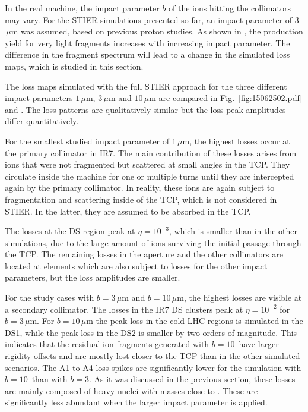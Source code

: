 In the real machine, the impact parameter $b$ of the ions hitting the collimators may vary. For the STIER simulations presented so far, an impact parameter of 3$\,\mu$m was assumed, based on previous proton studies.
As shown in , the production yield for very light fragments increases with increasing impact parameter. The difference in the fragment spectrum will lead to a change in the simulated loss maps, which is studied in this section.

\newpage
The loss maps simulated with the full STIER approach for the three different impact parameters $1\,\mu$m, $3\,\mu$m and $10\,\mu$m are compared in Fig.~\ref{fig:15062502.pdf} and . The loss patterns are qualitatively similar but the loss peak amplitudes differ quantitatively. 

For the smallest studied impact parameter of 1$\,\mu$m, the highest losses occur at the primary collimator in IR7. The main contribution of these losses arises from \lead ions that were not fragmented but scattered at small angles in the TCP. They circulate inside the machine for one or multiple turns until they are intercepted again by the primary collimator. In reality, these ions are again subject to fragmentation and scattering inside of the TCP, which is not considered in STIER. In the latter, they are assumed to be absorbed in the TCP.

The losses at the DS region peak at $\eta=10^{-3}$, which is smaller than in the other simulations, due to the large amount of \lead ions surviving the initial passage through the TCP. The remaining losses in the aperture and the other collimators are located at elements which are also subject to losses for the other impact parameters, but the loss amplitudes are smaller. 

For the study cases with $b=3\,\mu$m and $b=10\,\mu$m, the highest losses are visible at a secondary collimator. The losses in the IR7 DS clusters peak at $\eta=10^{-2}$ for $b=3\,\mu$m. For $b=10\,\mu$m the peak loss in the cold LHC regions is simulated in the DS1, while the peak loss in the DS2 is smaller by two orders of magnitude. This indicates that the residual ion fragments generated with $b=10$\mum\, have larger rigidity offsets and are mostly lost closer to the TCP than in the other simulated scenarios. The A1 to A4 loss spikes are significantly lower for the simulation with $b=10$\mum\, than with $b=3$\mum. As it was discussed in the previous section, these losses are mainly composed of heavy nuclei with masses close to \lead. These are significantly less abundant when the larger impact parameter is applied.

